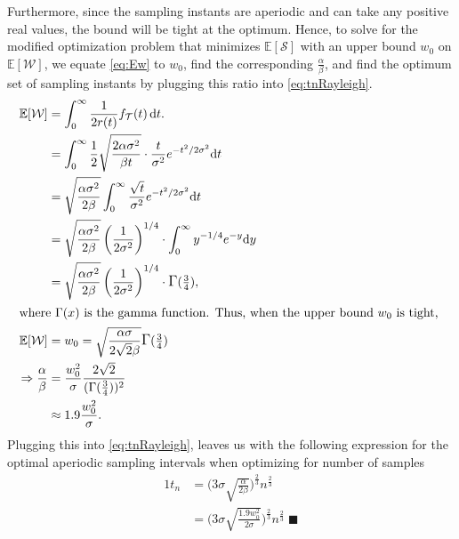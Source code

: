 Furthermore, since the sampling instants are aperiodic and can take any positive real values, the bound will be tight at the optimum. 
Hence, to solve for the modified optimization problem that minimizes $\mathbb{E}[\mathcal{S}]$ with an upper bound $w_0$ on $\mathbb{E}[\mathcal{W}]$, we equate \cref{eq:Ew} to $w_0$, find the corresponding $\frac{\alpha}{\beta}$, and find the optimum set of sampling instants by plugging this ratio into \cref{eq:tnRayleigh}.
\begin{alignat*}{1}
\mathbb{E}[\mathcal{W}]&=\int_{0}^{\infty}\dfrac{1}{2r(t)}f_\mathcal{T}(t)\,\mathrm{d}t.\nonumber\\
&=\int_{0}^{\infty}\frac{1}{2}\sqrt{\frac{2\alpha\sigma^2}{\beta t}}\cdot \frac{t}{\sigma^2}e^{-{t^2}/{2\sigma^2}}\mathrm{d}t\\
&=\sqrt{\frac{\alpha\sigma^2}{2\beta}}\int_{0}^{\infty}\frac{\sqrt{t}}{\sigma^2}e^{-{t^2}/{2\sigma^2}}\mathrm{d}t\\
&=\sqrt{\frac{\alpha\sigma^2}{2\beta}}\left({\frac{1}{{2}\sigma^2}}\right)^{1/4}\cdot\int_{0}^{\infty}y^{-1/4}e^{-y}\mathrm{d}y\\
&=\sqrt{\frac{\alpha\sigma^2}{2\beta}}\left({\frac{1}{{2}\sigma^2}}\right)^{1/4}\cdot\mathlarger{\Gamma}(\tfrac{3}{4}),\\
\intertext{%
    where $\mathlarger{\Gamma(x)}$ is the gamma function.
    Thus, when the upper bound $w_0$ is tight,
}
\mathbb{E}[\mathcal{W}]&=w_0=\sqrt{\frac{\alpha\sigma}{2\sqrt{2}\beta}}\mathlarger{\Gamma}(\tfrac{3}{4})\\
\Rightarrow\frac{\alpha}{\beta}&=\frac{w_0^2}{\sigma}\frac{2\sqrt{2}}{(\mathlarger{\Gamma}(\tfrac{3}{4}))^2}\\
&\approx1.9\frac{w_0^2}{\sigma}.
\end{alignat*}
Plugging this into \cref{eq:tnRayleigh}, leaves us with the following expression for the optimal aperiodic sampling intervals when optimizing for number of samples
\begin{alignat}{1}
    t_n&=\Big(3\sigma\!\sqrt{\tfrac{\alpha}{2\beta}}\Big)^{\frac{2}{3}}n^{\frac{2}{3}}\nonumber\\
    &=\Big(3\sigma\!\sqrt{\tfrac{1.9w_0^2}{2\sigma} }\Big)^{\frac{2}{3}}n^{\frac{2}{3}}\;\blacksquare\label{eq:tnRayleigh:samples}
\end{alignat}

